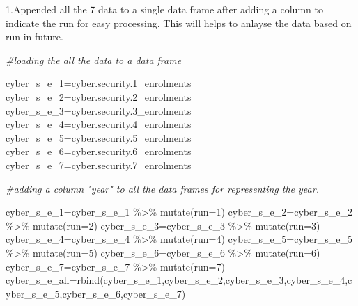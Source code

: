 \documentclass[
]{article}
\newenvironment{Shaded}{\begin{snugshade}}{\end{snugshade}}
\newcommand{\AttributeTok}[1]{\textcolor[rgb]{0.77,0.63,0.00}{#1}}
\newcommand{\CommentTok}[1]{\textcolor[rgb]{0.56,0.35,0.01}{\textit{#1}}}
\newcommand{\DecValTok}[1]{\textcolor[rgb]{0.00,0.00,0.81}{#1}}
\newcommand{\FloatTok}[1]{\textcolor[rgb]{0.00,0.00,0.81}{#1}}
\newcommand{\FunctionTok}[1]{\textcolor[rgb]{0.00,0.00,0.00}{#1}}
\newcommand{\NormalTok}[1]{#1}
\newcommand{\OtherTok}[1]{\textcolor[rgb]{0.56,0.35,0.01}{#1}}
\newcommand{\SpecialCharTok}[1]{\textcolor[rgb]{0.00,0.00,0.00}{#1}}
\begin{document}
1.Appended all the 7 data to a single data frame after adding a column
to indicate the run for easy processing. This will helps to anlayse the
data based on run in future.

\begin{Shaded}
\begin{Highlighting}[]
\CommentTok{\#loading the all the data to a data frame}

\NormalTok{cyber\_s\_e\_1}\OtherTok{=}\NormalTok{cyber.security}\FloatTok{.1}\NormalTok{\_enrolments}
\NormalTok{cyber\_s\_e\_2}\OtherTok{=}\NormalTok{cyber.security}\FloatTok{.2}\NormalTok{\_enrolments}
\NormalTok{cyber\_s\_e\_3}\OtherTok{=}\NormalTok{cyber.security}\FloatTok{.3}\NormalTok{\_enrolments}
\NormalTok{cyber\_s\_e\_4}\OtherTok{=}\NormalTok{cyber.security}\FloatTok{.4}\NormalTok{\_enrolments}
\NormalTok{cyber\_s\_e\_5}\OtherTok{=}\NormalTok{cyber.security}\FloatTok{.5}\NormalTok{\_enrolments}
\NormalTok{cyber\_s\_e\_6}\OtherTok{=}\NormalTok{cyber.security}\FloatTok{.6}\NormalTok{\_enrolments}
\NormalTok{cyber\_s\_e\_7}\OtherTok{=}\NormalTok{cyber.security}\FloatTok{.7}\NormalTok{\_enrolments}

\CommentTok{\#adding a column "year" to all the data frames for representing the year.}

\NormalTok{cyber\_s\_e\_1}\OtherTok{=}\NormalTok{cyber\_s\_e\_1 }\SpecialCharTok{\%\textgreater{}\%} \FunctionTok{mutate}\NormalTok{(}\AttributeTok{run=}\DecValTok{1}\NormalTok{)}
\NormalTok{cyber\_s\_e\_2}\OtherTok{=}\NormalTok{cyber\_s\_e\_2 }\SpecialCharTok{\%\textgreater{}\%} \FunctionTok{mutate}\NormalTok{(}\AttributeTok{run=}\DecValTok{2}\NormalTok{)}
\NormalTok{cyber\_s\_e\_3}\OtherTok{=}\NormalTok{cyber\_s\_e\_3 }\SpecialCharTok{\%\textgreater{}\%} \FunctionTok{mutate}\NormalTok{(}\AttributeTok{run=}\DecValTok{3}\NormalTok{)}
\NormalTok{cyber\_s\_e\_4}\OtherTok{=}\NormalTok{cyber\_s\_e\_4 }\SpecialCharTok{\%\textgreater{}\%} \FunctionTok{mutate}\NormalTok{(}\AttributeTok{run=}\DecValTok{4}\NormalTok{)}
\NormalTok{cyber\_s\_e\_5}\OtherTok{=}\NormalTok{cyber\_s\_e\_5 }\SpecialCharTok{\%\textgreater{}\%} \FunctionTok{mutate}\NormalTok{(}\AttributeTok{run=}\DecValTok{5}\NormalTok{)}
\NormalTok{cyber\_s\_e\_6}\OtherTok{=}\NormalTok{cyber\_s\_e\_6 }\SpecialCharTok{\%\textgreater{}\%} \FunctionTok{mutate}\NormalTok{(}\AttributeTok{run=}\DecValTok{6}\NormalTok{)}
\NormalTok{cyber\_s\_e\_7}\OtherTok{=}\NormalTok{cyber\_s\_e\_7 }\SpecialCharTok{\%\textgreater{}\%} \FunctionTok{mutate}\NormalTok{(}\AttributeTok{run=}\DecValTok{7}\NormalTok{)}
\NormalTok{cyber\_s\_e\_all}\OtherTok{=}\FunctionTok{rbind}\NormalTok{(cyber\_s\_e\_1,cyber\_s\_e\_2,cyber\_s\_e\_3,cyber\_s\_e\_4,cyber\_s\_e\_5,cyber\_s\_e\_6,cyber\_s\_e\_7)}
\end{Highlighting}
\end{Shaded}
\end{document}

